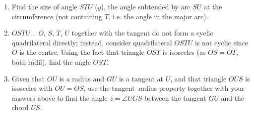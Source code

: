 \documentclass{article}
\begin{document}
\begin{preview}
\begin{question}
\begin{enumerate}
    \item[(a)] Find the size of angle $STU$ ($y$), the angle subtended by arc $SU$ at the circumference (not containing $T$, i.e. the angle in the major arc).

    \vspace{3.5cm}

    \item[(b)] $OSTU$... $O$, $S$, $T$, $U$ together with the tangent do not form a cyclic quadrilateral directly; instead, consider quadrilateral $OSTU$ is not cyclic since $O$ is the centre. Using the fact that triangle $OST$ is isosceles (as $OS = OT$, both radii), find the angle $OST$.

    \vspace{3.5cm}

    \item[(c)] Given that $OU$ is a radius and $GU$ is a tangent at $U$, and that triangle $OUS$ is isosceles with $OU = OS$, use the tangent--radius property together with your answers above to find the angle $z = \angle UGS$ between the tangent $GU$ and the chord $US$.

    \vspace{4cm}
\end{enumerate}
\end{question}

\end{preview}
\end{document}
